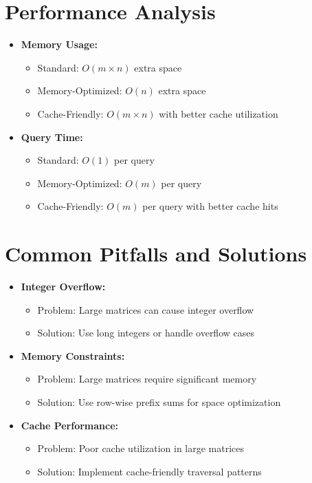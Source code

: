 \section*{Performance Analysis}
\begin{itemize}
    \item \textbf{Memory Usage:}
        \begin{itemize}
            \item Standard: \(O(m \times n)\) extra space
            \item Memory-Optimized: \(O(n)\) extra space
            \item Cache-Friendly: \(O(m \times n)\) with better cache utilization
        \end{itemize}
    \item \textbf{Query Time:}
        \begin{itemize}
            \item Standard: \(O(1)\) per query
            \item Memory-Optimized: \(O(m)\) per query
            \item Cache-Friendly: \(O(m)\) per query with better cache hits
        \end{itemize}
\end{itemize}

\section*{Common Pitfalls and Solutions}
\begin{itemize}
    \item \textbf{Integer Overflow:}
        \begin{itemize}
            \item Problem: Large matrices can cause integer overflow
            \item Solution: Use long integers or handle overflow cases
        \end{itemize}
    \item \textbf{Memory Constraints:}
        \begin{itemize}
            \item Problem: Large matrices require significant memory
            \item Solution: Use row-wise prefix sums for space optimization
        \end{itemize}
    \item \textbf{Cache Performance:}
        \begin{itemize}
            \item Problem: Poor cache utilization in large matrices
            \item Solution: Implement cache-friendly traversal patterns
        \end{itemize}
\end{itemize}

